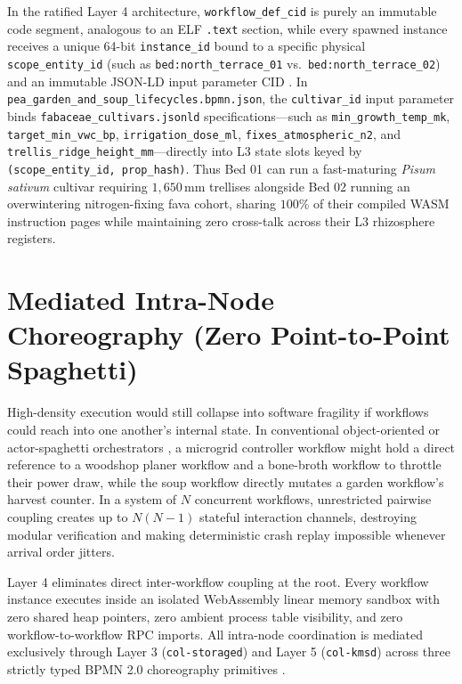 In the ratified Layer 4 architecture, \texttt{workflow\_def\_cid} is purely an immutable code segment,
analogous to an ELF \texttt{.text} section, while every spawned instance receives a unique 64-bit
\texttt{instance\_id} bound to a specific physical \texttt{scope\_entity\_id} (such as
\texttt{bed:north\_terrace\_01} vs.\ \texttt{bed:north\_terrace\_02}) and an immutable JSON-LD input
parameter CID \parencite{w3c2020jsonld}. In \texttt{pea\_garden\_and\_soup\_lifecycles.bpmn.json}, the
\texttt{cultivar\_id} input parameter binds \texttt{fabaceae\_cultivars.jsonld} specifications---such as
\texttt{min\_growth\_temp\_mk}, \texttt{target\_min\_vwc\_bp}, \texttt{irrigation\_dose\_ml},
\texttt{fixes\_atmospheric\_n2}, and \texttt{trellis\_ridge\_height\_mm}---directly into L3 state slots
keyed by \texttt{(scope\_entity\_id, prop\_hash)}. Thus Bed 01 can run a fast-maturing \emph{Pisum
sativum} cultivar requiring $1{,}650\,\mathrm{mm}$ trellises alongside Bed 02 running an overwintering
nitrogen-fixing fava cohort, sharing $100\%$ of their compiled WASM instruction pages while maintaining
zero cross-talk across their L3 rhizosphere registers.

\section{Mediated Intra-Node Choreography (Zero Point-to-Point Spaghetti)}
\label{sec:mediated-choreography}

High-density execution would still collapse into software fragility if workflows could reach into one
another's internal state. In conventional object-oriented or actor-spaghetti orchestrators
\parencite{agha1986actors}, a microgrid controller workflow might hold a direct reference to a woodshop
planer workflow and a bone-broth workflow to throttle their power draw, while the soup workflow directly
mutates a garden workflow's harvest counter. In a system of $N$ concurrent workflows, unrestricted
pairwise coupling creates up to $N(N-1)$ stateful interaction channels, destroying modular verification
\parencite{petri1962kommunikation,dennis1966programming} and making deterministic crash replay impossible
whenever arrival order jitters.

Layer 4 eliminates direct inter-workflow coupling at the root. Every workflow instance executes inside an
isolated WebAssembly linear memory sandbox \parencite{haas2017wasm} with zero shared heap pointers, zero
ambient process table visibility, and zero workflow-to-workflow RPC imports. All intra-node coordination
is mediated exclusively through Layer 3 (\texttt{col-storaged}) and Layer 5 (\texttt{col-kmsd}) across
three strictly typed BPMN 2.0 choreography primitives \parencite{omg2011bpmn,chinosi2012bpmn}.

